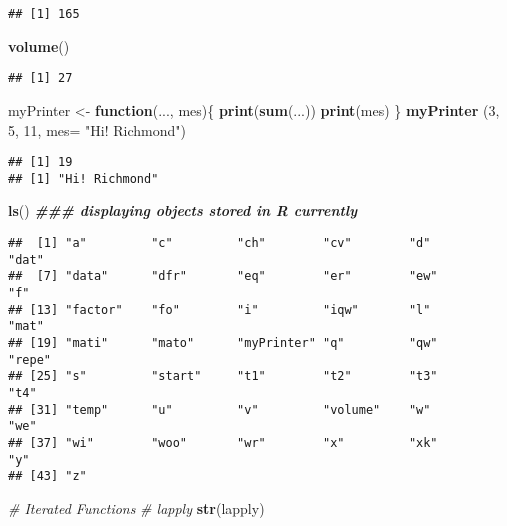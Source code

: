 \documentclass[
]{article}
\newenvironment{Shaded}{\begin{snugshade}}{\end{snugshade}}
\newcommand{\AttributeTok}[1]{\textcolor[rgb]{0.13,0.29,0.53}{#1}}
\newcommand{\CommentTok}[1]{\textcolor[rgb]{0.56,0.35,0.01}{\textit{#1}}}
\newcommand{\ControlFlowTok}[1]{\textcolor[rgb]{0.13,0.29,0.53}{\textbf{#1}}}
\newcommand{\DecValTok}[1]{\textcolor[rgb]{0.00,0.00,0.81}{#1}}
\newcommand{\DocumentationTok}[1]{\textcolor[rgb]{0.56,0.35,0.01}{\textbf{\textit{#1}}}}
\newcommand{\FunctionTok}[1]{\textcolor[rgb]{0.13,0.29,0.53}{\textbf{#1}}}
\newcommand{\NormalTok}[1]{#1}
\newcommand{\OtherTok}[1]{\textcolor[rgb]{0.56,0.35,0.01}{#1}}
\newcommand{\StringTok}[1]{\textcolor[rgb]{0.31,0.60,0.02}{#1}}
\begin{document}
\begin{verbatim}
## [1] 165
\end{verbatim}

\begin{Shaded}
\begin{Highlighting}[]
\FunctionTok{volume}\NormalTok{()}
\end{Highlighting}
\end{Shaded}

\begin{verbatim}
## [1] 27
\end{verbatim}

\begin{Shaded}
\begin{Highlighting}[]
\NormalTok{myPrinter }\OtherTok{\textless{}{-}} \ControlFlowTok{function}\NormalTok{(..., mes)\{}
\FunctionTok{print}\NormalTok{(}\FunctionTok{sum}\NormalTok{(...))}
\FunctionTok{print}\NormalTok{(mes)}
\NormalTok{\}}
\FunctionTok{myPrinter}\NormalTok{ (}\DecValTok{3}\NormalTok{, }\DecValTok{5}\NormalTok{, }\DecValTok{11}\NormalTok{, }\AttributeTok{mes=} \StringTok{"Hi! Richmond"}\NormalTok{)}
\end{Highlighting}
\end{Shaded}

\begin{verbatim}
## [1] 19
## [1] "Hi! Richmond"
\end{verbatim}

\begin{Shaded}
\begin{Highlighting}[]
\FunctionTok{ls}\NormalTok{() }\DocumentationTok{\#\#\# displaying objects stored in R currently}
\end{Highlighting}
\end{Shaded}

\begin{verbatim}
##  [1] "a"         "c"         "ch"        "cv"        "d"         "dat"      
##  [7] "data"      "dfr"       "eq"        "er"        "ew"        "f"        
## [13] "factor"    "fo"        "i"         "iqw"       "l"         "mat"      
## [19] "mati"      "mato"      "myPrinter" "q"         "qw"        "repe"     
## [25] "s"         "start"     "t1"        "t2"        "t3"        "t4"       
## [31] "temp"      "u"         "v"         "volume"    "w"         "we"       
## [37] "wi"        "woo"       "wr"        "x"         "xk"        "y"        
## [43] "z"
\end{verbatim}

\begin{Shaded}
\begin{Highlighting}[]
\CommentTok{\# Iterated Functions}
\CommentTok{\# lapply}
\FunctionTok{str}\NormalTok{(lapply)}
\end{Highlighting}
\end{Shaded}
\end{document}

